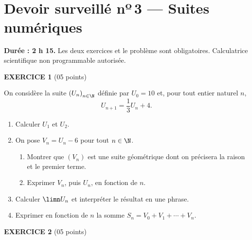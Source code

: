 \chapter*{Devoir surveillé nº\,3 — Suites numériques}

\begin{devoirsurveille}
\textbf{Durée : 2 h 15.} Les deux exercices et le problème sont obligatoires.
Calculatrice scientifique non programmable autorisée.

\vspace{0.7em}
\noindent\textbf{\sffamily EXERCICE 1} \hfill \textup{(05 points)}

On considère la suite $\left(U_{n}\right)_{n \in \N}$ définie par
$U_{0} = 10$ et, pour tout entier naturel $n$,
\[
  U_{n+1} = \frac13 U_{n}+4 .
\]

\begin{enumerate}[label=\textbf{\arabic*.}, leftmargin=*, itemsep=0.25em]
  \item Calculer $U_{1}$ et $U_{2}$. 
  \item On pose $V_{n} = U_{n}-6$ pour tout $n \in \N$.
    \begin{enumerate}[label=\textbf{\alph*)}, leftmargin=1.4em, itemsep=0.15em]
      \item Montrer que $\left(V_{n}\right)$ est une suite géométrique dont
            on précisera la raison et le premier terme. 
      \item Exprimer $V_{n}$, puis $U_{n}$, en fonction de $n$.
    \end{enumerate}
  \item Calculer $\limn U_{n}$ et interpréter le résultat en une phrase.
  \item Exprimer en fonction de $n$ la somme
        $S_{n} = V_{0}+V_{1}+\cdots+V_{n}$. 
\end{enumerate}

\vspace{0.7em}
\noindent\textbf{\sffamily EXERCICE 2} \hfill \textup{(05 points)}


\end{devoirsurveille}
